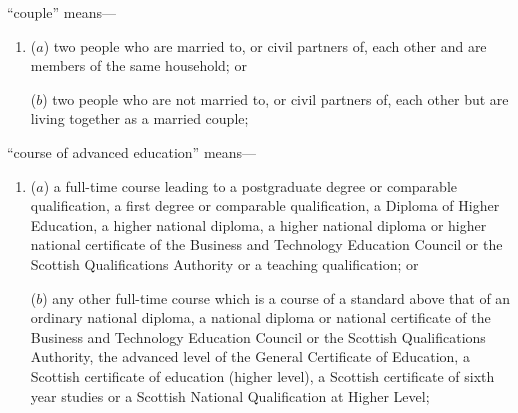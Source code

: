 \documentclass[12pt,a4paper]{article}
\begin{document}
\begin{enumerate}
%
%
%

“couple” means—
\begin{enumerate}\item[]
($a$) 
two people who are married to, or civil partners of, each other and are members of the same household; or

($b$) 
two people who are not married to, or civil partners of, each other but are living together as a married couple;
\end{enumerate}

“course of advanced education” means—
\begin{enumerate}\item[]
($a$) 
a full-time course leading to a postgraduate degree or comparable qualification, a first degree or comparable qualification, a Diploma of Higher Education, a higher national diploma, a higher national diploma or higher national certificate of the Business and Technology Education Council or the Scottish Qualifications Authority or a teaching qualification; or

($b$) 
any other full-time course which is a course of a standard above that of an ordinary national diploma, a national diploma or national certificate of the Business and Technology Education Council or the Scottish Qualifications Authority, the advanced level of the General Certificate of Education, a Scottish certificate of education (higher level), a Scottish certificate of sixth year studies or a Scottish National Qualification at Higher Level;
\end{enumerate}


\end{enumerate}
\end{document}
